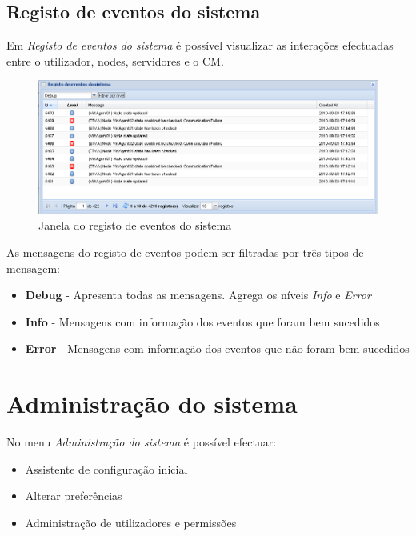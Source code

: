 \subsection{Registo de eventos do sistema}

Em \emph{Registo de eventos do sistema} é possível visualizar as interações efectuadas entre o utilizador, nodes, servidores e o CM.

\begin{figure}[H]
	\begin{center}
	\includegraphics[scale=0.5]{screenshots/events_log.png}
	\caption{Janela do registo de eventos do sistema}
	\label{fig:events_log}
	\end{center}
\end{figure}

As mensagens do registo de eventos podem ser filtradas por três tipos de mensagem:
\begin{itemize}
    \item {\bf Debug} - Apresenta todas as mensagens. Agrega os níveis \emph{Info} e \emph{Error}
    \item {\bf Info} - Mensagens com informação dos eventos que foram bem sucedidos
    \item {\bf Error} - Mensagens com informação dos eventos que não foram bem sucedidos
\end{itemize}

\section{Administração do sistema}
\label{sec:first_time_wizard}
No menu \emph{Administração do sistema} é possível efectuar:
\begin{itemize}
\item Assistente de configuração inicial
\item Alterar preferências
\item Administração de utilizadores e permissões
\end{itemize}

